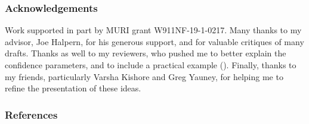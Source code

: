\documentclass[twoside]{article}
\newif\ifappendix
\theoremstyle{plain}
\theoremstyle{definition}
\begin{document}
\newpage
\subsubsection*{Acknowledgements}
Work supported in part by MURI grant W911NF-19-1-0217.
Many thanks to my advisor, Joe Halpern, for his generous support, and for valuable critiques of many drafts. Thanks as well to my reviewers, who pushed me to better explain the confidence parameters, and to include a practical example ().
Finally, thanks to my friends, particularly Varsha Kishore and Greg Yauney, for helping me to refine the presentation of these ideas.



\subsubsection*{References}


% 
% 
{
\printbibliography[heading=none]
}

\clearpage
\onecolumn
\appendix

\ifappendix
\end{document}
